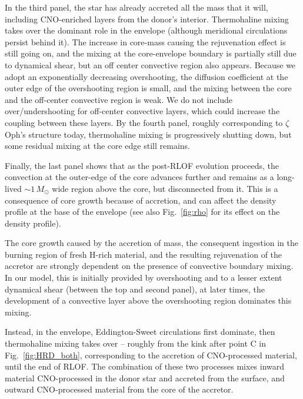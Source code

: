 \documentclass[twocolumn,twocolappendix,trackchanges]{aastex63}
\DeclareRobustCommand{\Figref}[1]{Fig.~\ref{#1}}
\newcommand{\zoph}{$\zeta$ Oph}
\begin{document}
In the third panel, the star has already accreted all the mass that it will, including CNO-enriched layers from the donor's interior. Thermohaline mixing takes over the dominant role in the envelope (although meridional circulations persist behind it). The increase in core-mass causing the rejuvenation effect is still going on, and the mixing at the core-envelope boundary is partially still due to dynamical shear, but an off center convective region also appears. Because we adopt an exponentially decreasing overshooting, the diffusion coefficient at the outer edge of the overshooting region is small, and the mixing between the core and the off-center convective region is weak. We do not include over/undershooting for off-center convective layers, which could increase the coupling between these layers. By the fourth panel, roughly corresponding to \zoph's structure today, thermohaline mixing is progressively shutting down, but some residual mixing at the core edge still remains.



Finally, the last panel shows that as the post-RLOF evolution
proceeds, the convection at the outer-edge of the core advances
further and remains as a long-lived
$\sim$$1\,M_\odot$ wide region above the core, but disconnected from it. This is a consequence of core growth because of accretion, and can affect the density profile at the base of the envelope (see
also \Figref{fig:rho} for its effect on the density profile).

The core growth caused by the accretion of mass, the
consequent ingestion in the burning region of fresh H-rich material, and the
resulting rejuvenation of the accretor are strongly dependent on the presence of
convective boundary mixing. In our model, this is initially provided by
overshooting and to a lesser extent dynamical shear (between the top
and second panel), at later times, the development of a convective
layer above the overshooting region dominates this mixing.

Instead, in the envelope, Eddington-Sweet circulations first dominate,
then thermohaline mixing takes over -- roughly from the kink after point C in \Figref{fig:HRD_both},
corresponding to the accretion of CNO-processed material,
until the end of RLOF. The combination
of these two processes mixes inward material CNO-processed in the
donor star and accreted from the surface, and outward CNO-processed
material from the core of the accretor.
\end{document}
